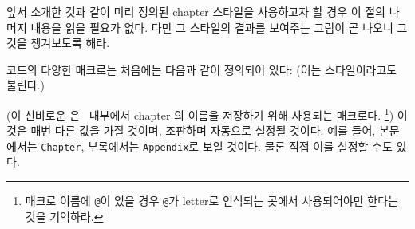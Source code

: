 앞서 소개한 것과 같이 미리 정의된 chapter 스타일을 사용하고자 할 경우
이 절의 나머지 내용을 읽을 필요가 없다.
다만 그 스타일의 결과를 보여주는 그림이 곧 나오니 그것을 챙겨보도록 해라.

 코드의 다양한 매크로는 처음에는 다음과 같이 정의되어 있다:
(이는  스타일이라고도 불린다.)
\begin{lcode}
\newcommand{\chapterheadstart}{\vspace*{\beforechapskip}}
\newcommand{\printchaptername}{\chapnamefont \@chapapp}
\newcommand{\chapternamenum}{\space}
\newcommand{\printchapternum}{\chapnumfont \thechapter}
\newcommand{\afterchapternum}{\par\nobreak\vskip \midchapskip}
\newcommand{\printchapternonum}{}
\newcommand{\printchaptertitle}[1]{\chaptitlefont #1}
\newcommand{\afterchaptertitle}{\par\nobreak\vskip \afterchapskip}
\newcommand{\chapnamefont}{\normalfont\huge\bfseries}
\newcommand{\chapnumfont}{\normalfont\huge\bfseries}
\newcommand{\chaptitlefont}{\normalfont\Huge\bfseries}
\setlength{\beforechapskip}{50pt}
\setlength{\midchapskip}{20pt}
\setlength{\afterchapskip}{40pt}
\end{lcode}
(이 신비로운 \cmd{\@chapapp}은 \ltx\ 내부에서 chapter 의 이름을 저장하기 위해
사용되는 매크로다. \footnote{
매크로 이름에 \texttt{@}이 있을 경우 \texttt{@}가 letter로 인식되는 곳에서
사용되어야만 한다는 것을 기억하라.
})
이것은 매번 다른 값을 가질 것이며, 조판하며 자동으로 설정될 것이다.
예를 들어, 본문에서는 \texttt{Chapter}, 부록에서는 
\texttt{Appendix}로 보일 것이다.
물론 직접 이를 설정할 수도 있다.




